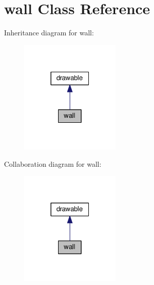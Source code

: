 \hypertarget{classwall}{}\section{wall Class Reference}
\label{classwall}


Inheritance diagram for wall\+:\nopagebreak
\begin{figure}[H]
\begin{center}
\leavevmode
\includegraphics[width=136pt]{classwall__inherit__graph}
\end{center}
\end{figure}


Collaboration diagram for wall\+:\nopagebreak
\begin{figure}[H]
\begin{center}
\leavevmode
\includegraphics[width=136pt]{classwall__coll__graph}
\end{center}
\end{figure}
